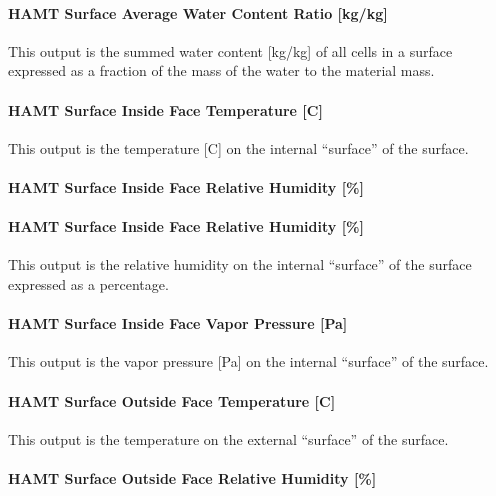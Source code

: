 \paragraph{HAMT Surface Average Water Content Ratio {[}kg/kg{]}}\label{hamt-surface-average-water-content-ratio-kgkg}

This output is the summed water content {[}kg/kg{]} of all cells in a surface expressed as a fraction of the mass of the water to the material mass.

\paragraph{HAMT Surface Inside Face Temperature {[}C{]}}\label{hamt-surface-inside-face-temperature-c}

This output is the temperature {[}C{]} on the internal ``surface'' of the surface.

\paragraph{HAMT Surface Inside Face Relative Humidity {[}\%{]}}\label{hamt-surface-inside-face-relative-humidity}

\paragraph{HAMT Surface Inside Face Relative Humidity {[}\%{]}}\label{hamt-surface-inside-face-relative-humidity-1}

This output is the relative humidity on the internal ``surface'' of the surface expressed as a percentage.

\paragraph{HAMT Surface Inside Face Vapor Pressure {[}Pa{]}}\label{hamt-surface-inside-face-vapor-pressure-pa}

This output is the vapor pressure {[}Pa{]} on the internal ``surface'' of the surface.

\paragraph{HAMT Surface Outside Face Temperature {[}C{]}}\label{hamt-surface-outside-face-temperature-c}

This output is the temperature on the external ``surface'' of the surface.

\paragraph{HAMT Surface Outside Face Relative Humidity {[}\%{]}}\label{hamt-surface-outside-face-relative-humidity}

